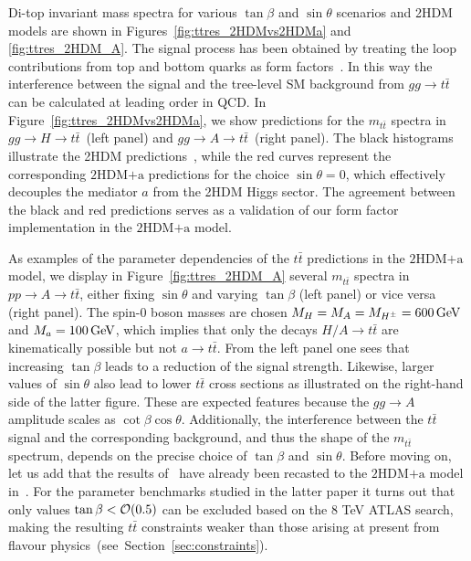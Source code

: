 \documentclass[a4paper, 11pt,notoc]{article}
\newcommand{\mA}{\ensuremath{M_{A}}\xspace}
\newcommand{\ma}{\ensuremath{M_{a}}\xspace}
\newcommand{\mH}{\ensuremath{M_{H}}\xspace}
\newcommand{\mHc}{\ensuremath{M_{H^{\pm}}}\xspace}
\newcommand{\hdma}{\ensuremath{\textrm{2HDM+a}}\xspace}
\begin{document}
Di-top invariant mass spectra for various $\tan \beta$ and $\sin \theta$ scenarios and 2HDM models are shown in Figures~\ref{fig:ttres_2HDMvs2HDMa} and \ref{fig:ttres_2HDM_A}. The signal process has been obtained by treating the loop contributions from top and bottom quarks as form factors~\cite{FranzosiZhang}. In this way the interference between the signal and the tree-level SM background from $gg \to t \bar t$ can be calculated at leading order in QCD. In Figure~\ref{fig:ttres_2HDMvs2HDMa}, we show predictions for the $m_{t \bar t}$ spectra in $gg \to H \to t \bar t$~(left panel) and $gg \to A \to t \bar t$~(right panel). The black histograms illustrate the 2HDM predictions~\cite{Aaboud:2017hnm}, while the red curves represent the corresponding \hdma predictions for the choice $\sin \theta = 0$, which effectively decouples the mediator $a$ from the 2HDM Higgs sector. The agreement between the black and red predictions serves as a validation of our form factor implementation in the \hdma model. 

As examples of the parameter dependencies of the $t \bar t$ predictions in the \hdma model, we display in  Figure~\ref{fig:ttres_2HDM_A} several $m_{t \bar t}$ spectra in $pp \to A \to t \bar t$, either fixing $\sin \theta$ and varying $\tan \beta$ (left panel) or vice versa (right panel). The  spin-0 boson  masses are chosen $\mH=\mA=\mHc =600 \, {\rm GeV}$ and $\ma=100 \, {\rm GeV}$, which implies that only the  decays $H/A \to t \bar t$  are kinematically possible but not $a \to t \bar t$.  From the left panel one sees that increasing $\tan \beta$ leads  to a reduction of the signal strength.  Likewise, larger values of $\sin \theta$ also lead to lower $t \bar t$ cross sections as illustrated on the right-hand side of the latter figure. These are expected features because the $g g \to A$ amplitude  scales as $\cot \beta \cos \theta$.  Additionally, the interference between the $t \bar t$ signal and the corresponding background, and thus the shape of the $m_{t \bar t}$ spectrum, depends on the precise choice of $\tan \beta$  and $\sin \theta$.  Before moving on, let us add that the results of~\cite{Aaboud:2017hnm} have already been recasted to the \hdma model in~\cite{Bauer:2017ota}. For the parameter benchmarks studied in the latter paper it turns out that only values $\tan \beta < {\cal O} ( 0.5)$ can be excluded based on the 8 TeV ATLAS search, making the resulting $t \bar t$ constraints weaker than those arising at present from flavour physics~(see~Section~\ref{sec:constraints}). 
\end{document}
